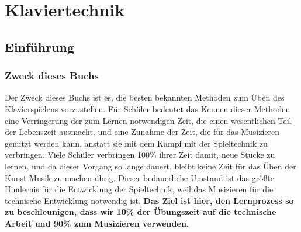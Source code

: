 
\chapter{Klaviertechnik}
\label{c1i1}

\section{Einführung} 

\subsection{Zweck dieses Buchs}

Der Zweck dieses Buchs ist es, die besten bekannten Methoden zum Üben des Klavierspielens vorzustellen.
Für Schüler bedeutet das 
Kennen dieser Methoden eine Verringerung der zum Lernen notwendigen Zeit, die einen wesentlichen Teil der Lebenszeit ausmacht, und eine Zunahme der Zeit, die für das Musizieren genutzt werden kann, anstatt sie mit dem Kampf mit der Spieltechnik zu verbringen.
Viele Schüler verbringen 100\% ihrer Zeit damit, neue Stücke zu lernen, und da dieser Vorgang so lange dauert, bleibt keine Zeit für das Üben der Kunst Musik zu machen übrig.
Dieser bedauerliche Umstand ist das größte Hindernis für die Entwicklung der Spieltechnik, weil das Musizieren für die technische Entwicklung notwendig ist.
\textbf{Das Ziel ist hier, den Lernprozess so zu beschleunigen, dass wir 10\% der Übungszeit auf die technische Arbeit und 90\% zum Musizieren verwenden.}

